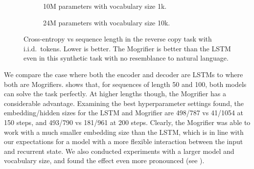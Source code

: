 \begin{figure}[!t]
  \begin{subfigure}{0.49\linewidth}
  \caption{10M parameters with vocabulary size 1k.}
  \label{fig:copy-10m-results}
  \end{subfigure}
  \hfill
  \begin{subfigure}{0.47\linewidth}
  \caption{24M parameters with vocabulary size 10k.}
  \label{fig:copy-24m-results}
  \end{subfigure}
  \caption[Cross-entropy vs sequence length in the reverse copy
    task.]{Cross-entropy vs sequence length in the reverse copy
    task with i.i.d.\ tokens. Lower is better. The Mogrifier is better
    than the LSTM even in this synthetic task with no resemblance to
    natural language.}
\end{figure}

We compare the case where both the encoder and decoder are LSTMs to
where both are Mogrifiers.
%
 shows that, for sequences of length
50 and 100, both models can solve the task perfectly.
%
At higher lengths though, the Mogrifier has a considerable advantage.
%
Examining the best hyperparameter settings found, the embedding/hidden
sizes for the LSTM and Mogrifier are 498/787 vs 41/1054 at 150 steps,
and 493/790 vs 181/961 at 200 steps.
%
Clearly, the Mogrifier was able to work with a much smaller embedding
size than the LSTM, which is in line with our expectations for a model
with a more flexible interaction between the input and recurrent
state.
%
We also conducted experiments with a larger model and vocabulary size,
and found the effect even more pronounced (see
).

